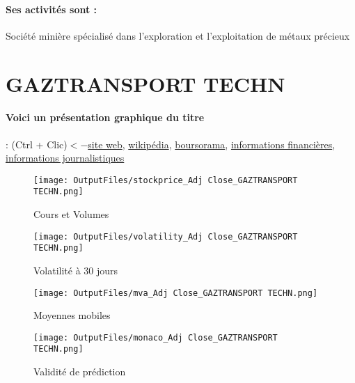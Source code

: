 \documentclass[11pt,a4paper]{report}%
\begin{document}
\paragraph{Ses activités sont : } Société minière spécialisé dans l’exploration et l’exploitation de métaux précieux 
    
    \newpage

\section{GAZTRANSPORT TECHN}

\paragraph{Voici un présentation graphique du titre} : (Ctrl + Clic)$<-$\href{https://www.gtt.fr/fr/finance/relations-investisseurs/presentations-financieres}{site web}, \href{https://fr.wikipedia.org/wiki/GTT_(entreprise)}{wikipédia}, \href{https://www.boursorama.com/cours/1rPGTT}{boursorama}, \href{https://www.qwant.com/?q=site:https:%2f%2fwww.easybourse.com%2faction-societe%2fGAZTRANSPORT-TECHN&t=web&client=ext-firefox-hp}{informations financières}, \href{https://bourse.lerevenu.com/cours-de-bourse/fiche-valeur-synthese/GAZTRANSPORT-TECHN/GTT-FR}{informations journalistiques}
\begin{figure}[!htb]
   \begin{minipage}{0.5\textwidth}
     \centering
     \texttt{[image: OutputFiles/stockprice\_Adj Close\_GAZTRANSPORT TECHN.png]}
     \caption{Cours et Volumes}\label{Fig:price_GAZTRANSPORT TECHN}
   \end{minipage}\hfill
   \begin{minipage}{0.5\textwidth}
     \centering
     \texttt{[image: OutputFiles/volatility\_Adj Close\_GAZTRANSPORT TECHN.png]}
     \caption{Volatilité à 30 jours}\label{Fig:volat_GAZTRANSPORT TECHN}
   \end{minipage}
\end{figure}
\begin{figure}[!htb]
   \begin{minipage}{0.5\textwidth}
     \centering
     \texttt{[image: OutputFiles/mva\_Adj Close\_GAZTRANSPORT TECHN.png]}
     \caption{Moyennes mobiles}\label{Fig:mva_GAZTRANSPORT TECHN}
   \end{minipage}\hfill
   \begin{minipage}{0.5\textwidth}
     \centering
     \texttt{[image: OutputFiles/monaco\_Adj Close\_GAZTRANSPORT TECHN.png]}
     \caption{Validité de prédiction}\label{Fig:prediction_GAZTRANSPORT TECHN}
   \end{minipage}
\end{figure}
\end{document}
